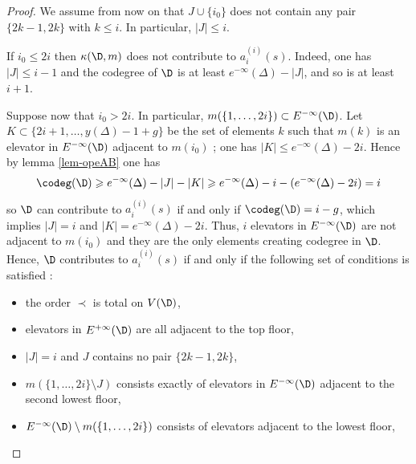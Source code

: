 \begin{proof}
We assume from now on that $J\cup \{i_0\}$ does not contain any pair $\{2k-1,2k\}$ with $k\leqslant i$. In particular, $|J| \leqslant i$.



If $i_0 \leqslant 2i$ then $\kappa(\D,m)$ does not contribute to $a_i^{(i)}(s)$.
Indeed, one has $|J| \leqslant i-1$ and the codegree of $\D$ is at least $e^{-\infty}(\Delta)-|J|$, and so is at least $i+1$.


Suppose now that $i_0 > 2i$. In particular, $m(\{1,\dots,2i\}) \subset E^{-\infty}(\D)$. Let $K \subset \{ 2i+1,\dots, y(\Delta)-1 +g \}$ be the set of elements $k$ such that $m(k)$ is an elevator in $E^{-\infty}(\D)$ adjacent to $m(i_0)$ ; one has $|K| \leqslant e^{-\infty}(\Delta) - 2i$. Hence by lemma \ref{lem-opeAB} one has
\[ \codeg(\D) \geqslant e^{-\infty}(\Delta)  - |J| - |K| \geqslant e^{-\infty}(\Delta)  - i - (e^{-\infty}(\Delta) -2i) = i \]
so $\D$ can contribute to $a_i^{(i)}(s)$ if and only if $\codeg(\D) = i-g$, which implies $|J| = i$ and $|K| = e^{-\infty}(\Delta) -2i$. Thus, $i$ elevators in $E^{-\infty}(\D)$ are not adjacent to $m(i_0)$ and they are the only elements creating codegree in $\D$. Hence, $\D$ contributes to $a_i^{(i)}(s)$ if and only if the following set of conditions is satisfied :



\begin{itemize}
\item the order $\prec$ is total on $V(\D)$,

\item elevators in $E^{+\infty}(\D)$ are all adjacent to the top floor,

\item $|J| = i$ and $J$ contains no pair $\{2k-1, 2k\}$,

\item $m(\{1,\dots,2i\}\setminus J)$ consists exactly of elevators in $E^{-\infty}(\D)$ adjacent to the second lowest floor,

\item $E^{-\infty}(\D) \setminus m(\{ 1,\dots,2i \})$ consists of elevators adjacent to the lowest floor,


\end{itemize}
\end{proof}
